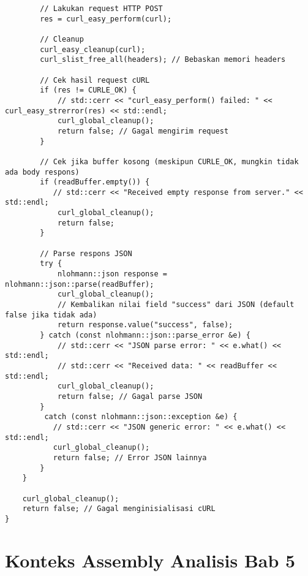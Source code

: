 \begin{verbatim}
        // Lakukan request HTTP POST
        res = curl_easy_perform(curl);

        // Cleanup
        curl_easy_cleanup(curl);
        curl_slist_free_all(headers); // Bebaskan memori headers

        // Cek hasil request cURL
        if (res != CURLE_OK) {
            // std::cerr << "curl_easy_perform() failed: " << curl_easy_strerror(res) << std::endl;
            curl_global_cleanup();
            return false; // Gagal mengirim request
        }

        // Cek jika buffer kosong (meskipun CURLE_OK, mungkin tidak ada body respons)
        if (readBuffer.empty()) {
           // std::cerr << "Received empty response from server." << std::endl;
            curl_global_cleanup();
            return false;
        }

        // Parse respons JSON
        try {
            nlohmann::json response = nlohmann::json::parse(readBuffer);
            curl_global_cleanup();
            // Kembalikan nilai field "success" dari JSON (default false jika tidak ada)
            return response.value("success", false);
        } catch (const nlohmann::json::parse_error &e) {
            // std::cerr << "JSON parse error: " << e.what() << std::endl;
            // std::cerr << "Received data: " << readBuffer << std::endl;
            curl_global_cleanup();
            return false; // Gagal parse JSON
        }
         catch (const nlohmann::json::exception &e) {
           // std::cerr << "JSON generic error: " << e.what() << std::endl;
           curl_global_cleanup();
           return false; // Error JSON lainnya
        }
    }

    curl_global_cleanup();
    return false; // Gagal menginisialisasi cURL
}
\end{verbatim}
\label{lst:send_login_request_full}


\chapter*{Konteks Assembly Analisis Bab 5}
\label{app:kode_asm} %

